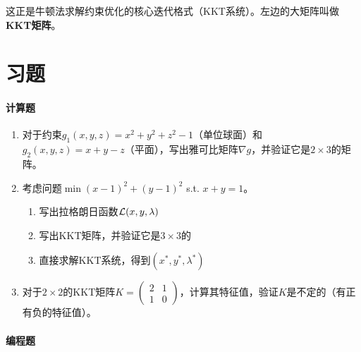 这正是牛顿法求解约束优化的核心迭代格式（KKT系统）。左边的大矩阵叫做\textbf{KKT矩阵}。


\section{习题}

\paragraph{计算题}

\begin{enumerate}
    \item 对于约束$g_1(x,y,z) = x^2 + y^2 + z^2 - 1$（单位球面）和$g_2(x,y,z) = x + y - z$（平面），写出雅可比矩阵$\nabla g$，并验证它是$2 \times 3$的矩阵。
    
    \item 考虑问题$\min (x-1)^2 + (y-1)^2$ s.t. $x + y = 1$。
    \begin{enumerate}
        \item 写出拉格朗日函数$\mathcal{L}(x, y, \lambda)$
        \item 写出KKT矩阵，并验证它是$3 \times 3$的
        \item 直接求解KKT系统，得到$(x^*, y^*, \lambda^*)$
    \end{enumerate}
    
    \item 对于$2 \times 2$的KKT矩阵$K = \begin{pmatrix} 2 & 1 \\ 1 & 0 \end{pmatrix}$，计算其特征值，验证$K$是不定的（有正有负的特征值）。
\end{enumerate}

\paragraph{编程题}

